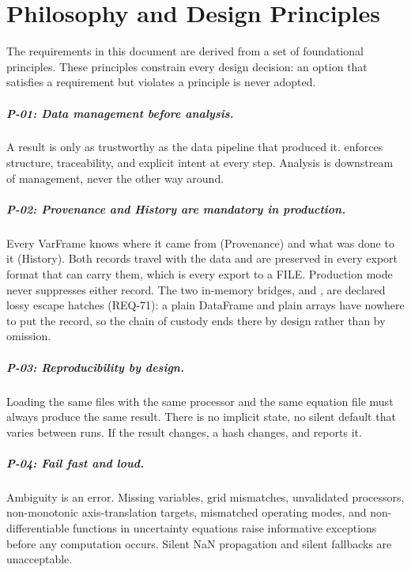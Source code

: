 
\chapter{Philosophy and Design Principles}
\label{ch:philosophy}

The requirements in this document are derived from a set of foundational
principles. These principles constrain every design decision: an option that
satisfies a requirement but violates a principle is never adopted.

\paragraph{P-01: Data management before analysis.}
A result is only as trustworthy as the data pipeline that produced it.
\itc{} enforces structure, traceability, and explicit intent at every step.
Analysis is downstream of management, never the other way around.

\paragraph{P-02: Provenance and History are mandatory in production.}
Every VarFrame knows where it came from (Provenance) and what was done to it
(History). Both records travel with the data and are preserved in every
export format that can carry them, which is every export to a FILE.
Production mode never suppresses either record. The two in-memory
bridges,  and , are declared
lossy escape hatches (REQ-71): a plain DataFrame and plain arrays have
nowhere to put the record, so the chain of custody ends there by design
rather than by omission.

\paragraph{P-03: Reproducibility by design.}
Loading the same files with the same processor and the same equation file
must always produce the same result. There is no implicit state, no silent
default that varies between runs. If the result changes, a hash changes, and
\itc{} reports it.

\paragraph{P-04: Fail fast and loud.}
Ambiguity is an error. Missing variables, grid mismatches, unvalidated
processors, non-monotonic axis-translation targets, mismatched operating
modes, and non-differentiable functions in uncertainty equations raise
informative exceptions before any computation occurs. Silent NaN propagation
and silent fallbacks are unacceptable.

